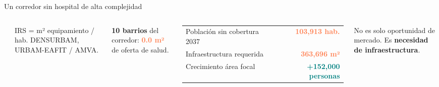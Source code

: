 \documentclass[aspectratio=169, 11pt]{beamer}
\newcommand{\highlight}[1]{\textcolor{teal}{\textbf{#1}}}
\newcommand{\danger}[1]{\textcolor{coral}{\textbf{#1}}}
\begin{document}
{\begin{frame}{Un corredor sin hospital de alta complejidad}
\begin{columns}[T]
\begin{center}
\end{center}

\vspace{1pt}
{\tiny IRS = m² equipamiento / hab. DENSURBAM, URBAM-EAFIT / AMVA.}

\vspace{3pt}
{\small\textbf{10 barrios} del corredor: \danger{0.0 m²} de oferta de salud.}

\vspace{2pt}
{\scriptsize
\begin{tabular}{@{}lr@{}}
Población sin cobertura 2037 & \danger{103,913 hab.} \\
Infraestructura requerida & \danger{363,696 m²} \\
Crecimiento área focal & \highlight{+152,000 personas} \\
\end{tabular}
}

\vspace{3pt}
{\scriptsize No es solo oportunidad de mercado. Es \textbf{necesidad de infraestructura}.}
\end{columns}
\end{frame}
}
\end{document}
